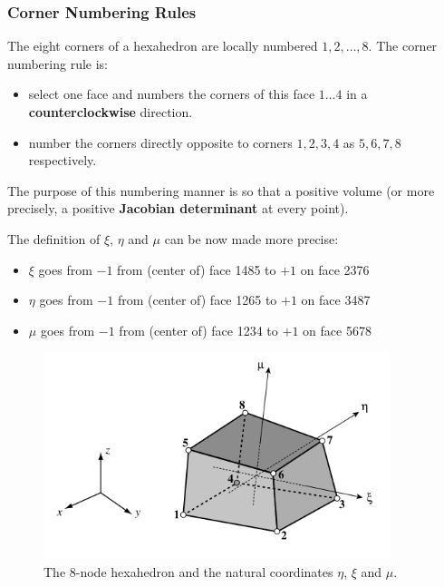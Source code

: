 \documentclass[10pt,b5paper,titlepage]{book}
\begin{document}
\subsubsection{Corner Numbering Rules}
The eight corners of a hexahedron are locally numbered $ 1, 2, \dots , 8 $.
The corner numbering rule is:

\begin{itemize}
    \item select one face and numbers the corners of this face $ 1 \dots 4 $
          in a \textbf{counterclockwise} direction.
    \item number the corners directly opposite to corners $ 1, 2, 3, 4 $ as
          $ 5, 6, 7, 8 $ respectively.
\end{itemize}

The purpose of this numbering manner is so that a positive volume (or more
precisely, a positive \textbf{Jacobian determinant} at every point).

The definition of $ \xi $, $ \eta $ and $ \mu $ can be now made more precise:

\begin{itemize}
    \item $ \xi $ goes from $ -1 $ from (center of) face 1485 to $ +1 $ on face 2376
    \item $ \eta $ goes from $ -1 $ from (center of) face 1265 to $ +1 $ on face 3487
    \item $ \mu $ goes from $ -1 $ from (center of) face 1234 to $ +1 $ on face 5678
\end{itemize}

\begin{figure}[ht]
    \centering
    \includegraphics[width=0.90\textwidth]{img/hex8-node-numbers.png}
    \caption{The 8-node hexahedron and the natural coordinates $ \eta $, $ \xi $
    and $ \mu $.}
    \label{fig:hex8-node-numbers-png}
\end{figure}
\end{document}
